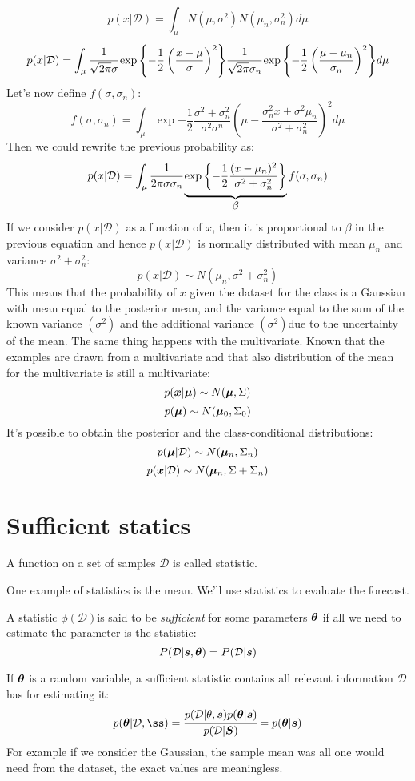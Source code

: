 \[
	p(x\vert \mathcal{D})=\int_\mu N(\mu, \sigma^2)N(\mu_n, \sigma_n^2)d\mu
\]
\[
	p(x\vert \mathcal{D})=\int_\mu \cfrac{1}{\sqrt{2\pi}\sigma}\exp{-\frac{1}{2}\left(\frac{x-\mu}{\sigma}\right)^2} \cfrac{1}{\sqrt{2\pi}\sigma_n}\exp{-\frac{1}{2}\left(\frac{\mu-\mu_n}{\sigma_n}\right)^2} d\mu
\]
Let's now define $f(\sigma,\sigma_n)$:
\[
	f(\sigma,\sigma_n)=\int_\mu\exp{-\frac{1}{2}\frac{\sigma^2+\sigma_n^2}{\sigma^2\sigma^n}\left(\mu-\frac{\sigma_n^2x+\sigma^2\mu_n}{\sigma^2+\sigma_n^2} \right)^2}d\mu
\]
Then we could rewrite the previous probability as:
\[
	p(x\vert \mathcal{D})=\int_\mu \cfrac{1}{2\pi\sigma\sigma_n}
	\underbrace{\exp{-\frac{1}{2}\frac{(x-\mu_n)^2}{\sigma^2+\sigma_n^2}}\rule[-12pt]{0pt}{5pt}}_{\mbox{$\beta$}} 
	f(\sigma,\sigma_n)
\]
If we consider $p(x\vert\mathcal{D})$ as a function of $x$, then it is proportional to $\beta$ in the previous equation and hence $p(x\vert\mathcal{D})$ is normally distributed with mean $\mu_n$ and variance $\sigma^2+\sigma^2_n$:
\[
	p(x\vert\mathcal{D})\sim N(\mu_n,\sigma^2+\sigma^2_n)
\]
This means that the probability of $x$ given the dataset for the class is a Gaussian with mean equal to the posterior mean, and the variance equal to the sum of the known variance $(\sigma^2)$ and the additional variance $(\sigma^2)$due to the uncertainty of the mean.\newline
The same thing happens with the multivariate. Known that the examples are drawn from a multivariate and that also distribution of the mean for the multivariate is still a multivariate:
\[ p(\bm{x}\vert\bm{\mu})\sim N(\bm{\mu},\Sigma) \]
\[ p(\bm{\mu})\sim N(\bm{\mu}_0,\Sigma_0) \]
It's possible to obtain the posterior and the class-conditional distributions:
\[p(\bm{\mu}\vert\mathcal{D})\sim N(\bm{\mu}_n,\Sigma_n) \]
\[p(\bm{x}\vert\mathcal{D})\sim N(\bm{\mu}_n,\Sigma+\Sigma_n) \]
%
%
%
\section{Sufficient statics}
\begin{definition}[Statistic]
A function on a set of samples $\mathcal{D}$ is called statistic.
\end{definition}
One example of statistics is the mean. We'll use statistics to evaluate the forecast. \newline
\begin{definition}
A statistic $\phi(\mathcal{D})$is said to be \textit{sufficient} for some parameters $\bm{\theta}$ if all we need to estimate the parameter is the statistic:
\[
	P(\mathcal{D}\vert\bm{s},\bm{\theta})=P(\mathcal{D}\vert\bm{s})
\]
\end{definition}
If $\bm{\theta}$ is a random variable, a sufficient statistic contains all relevant information $\mathcal{D}$ has for estimating it:
\[
	p(\vect{\theta}\vert\mathcal{D},\vect{ß})=\cfrac{p(\mathcal{D}\vert\theta,\vect{s})p(\vect{\theta}\vert\vect{s})}{p(\mathcal{D}\vert\vect{S})}=p(\vect{\theta}\vert\vect{s})
\]
For example if we consider the Gaussian, the sample mean was all one would need from the dataset, the exact values are meaningless. 
%
%
%
